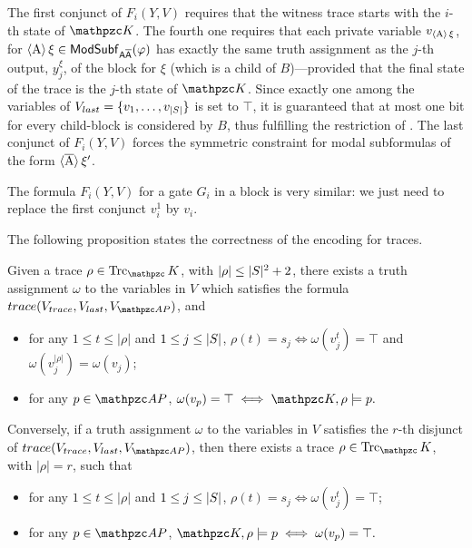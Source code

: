 The first conjunct of $F_i(Y,V)$ requires that the witness trace starts with the $i$-th state of $\Ku$. The fourth one requires that each private variable $v_{\operatorname{\langle A\rangle}\xi}$, for $\operatorname{\langle A\rangle}\xi \in\mathsf{ModSubf}_{\mathsf{A\overline{A}}}(\varphi)$ has exactly the same truth assignment as the $j$-th output, $y_j^\xi$, of the block for $\xi$
(which is a child of $B$)---provided that the final state of the trace is the $j$-th state of $\Ku$.
Since exactly one among the variables of $V_{last}=\{v_1,\ldots , v_{|S|}\}$ is set to $\top$, it is guaranteed that at most one bit for every child-block is considered by $B$, thus fulfilling the restriction of \TBSATM. The last conjunct of $F_i(Y,V)$ forces the symmetric constraint for modal subformulas of the form $\operatorname{\langle \overline{A}\rangle}\xi'$.

The formula $F_i(Y,V)$ for a gate $G_i$ in a \back{} block is very similar: we just need to replace the first conjunct $v_i^1$ by $v_i$.

The following proposition states the correctness of the encoding for traces.

\begin{proposition}\label{remk}
Given a trace $\rho\in\Trk_\Ku$, with $|\rho|\leq |S|^2+2$, 
there exists a truth assignment $\omega$ to the variables in $V$ which satisfies the formula $trace(V_{trace},V_{last},V_{\Prop})$, and 
\begin{itemize}
\item for any $1 \leq t \leq |\rho|$ and $1 \leq j \leq |S|$, $\rho(t)\!=\!s_j\!\iff\!\omega(v_j^t)\!=\!\top$ and $\omega(v_j^{|\rho|})=\omega(v_j)$;
\item for any $p\in\Prop$, $\omega(v_p)=\top\iff\Ku,\rho\models p.$
\end{itemize}
%
Conversely,
if a truth assignment $\omega$ to the variables in $V$ satisfies the $r$-th disjunct of $trace(V_{trace},V_{last},V_{\Prop})$,
then there exists a trace $\rho\in\Trk_\Ku$, with $|\rho|=r$, such that
\begin{itemize}
\item for any $1 \leq t \leq |\rho|$ and $1 \leq j \leq |S|$, $\rho(t)=s_j\iff\omega(v_j^t)=\top$;
\item for any $p\in\Prop$, $\Ku,\rho\models p\iff\omega(v_p)=\top.$
\end{itemize}
\end{proposition}


